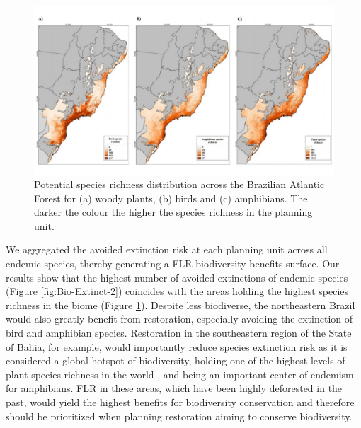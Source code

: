  \newpage
\begin{figure}[H]
\includegraphics[width=1.0\linewidth]{pictureve/Bio-Extinct-1.pdf}
\caption{Potential species richness distribution across the Brazilian Atlantic Forest for (a) woody plants, (b) birds and (c) amphibians. The darker the colour the higher the species richness in the planning unit.}
\label{fig:Bio-Extinct-1}
\end{figure}
 
 

We aggregated the avoided extinction risk at each planning unit across all endemic species, thereby generating a FLR biodiversity-benefits surface. Our results show that the highest number of avoided extinctions of endemic species (Figure \ref{fig:Bio-Extinct-2}) coincides with the areas holding the highest species richness in the biome (Figure \ref{fig:Bio-Extinct-1}). Despite less biodiverse, the northeastern Brazil would also greatly benefit from restoration, especially avoiding the extinction of bird and amphibian species. Restoration in the southeastern region of the State of Bahia, for example, would importantly reduce species extinction risk as it is considered a global hotspot of biodiversity, holding one of the highest levels of plant species richness in the world \citep{Thomas1998}, and being an important center of endemism for amphibians. FLR in these areas, which have been highly deforested in the past, would yield the highest benefits for biodiversity conservation and therefore should be prioritized when planning restoration aiming to conserve biodiversity.  \\

